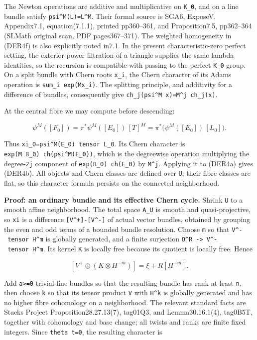 \documentclass[11pt,a4paper]{article}
\theoremstyle{definition}
\begin{document}
The Newton operations are additive and multiplicative on \texttt{K\_0},
and on a line bundle satisfy \texttt{psi\^{}M(L)=L\^{}M}. Their formal
source is SGA6, ExposeV, Appendix7.1, equation(7.1.1), printed
pp360--361, and Proposition7.5, pp362--364 (SLMath original scan, PDF
pages367--371). The weighted homogeneity in (DER4f) is also explicitly
noted in7.1. In the present characteristic-zero perfect setting, the
exterior-power filtration of a triangle supplies the same lambda
identities, so the recursion is compatible with passing to the perfect
\texttt{K\_0} group. On a split bundle with Chern roots \texttt{x\_i},
the Chern character of its Adams operation is
\texttt{sum\_i\ exp(Mx\_i)}. The splitting principle, and additivity for
a difference of bundles, consequently give
\texttt{ch\_j(psi\^{}M\ x)=M\^{}j\ ch\_j(x)}.

At the central fibre we may compute before descending:

\[
 \psi^M([F_0])
 =\pi^*\psi^M([E_0])\,[T]^M
 =\pi^*\bigl(\psi^M([E_0])\,[L_0]\bigr).
\]

Thus \texttt{xi\_0=psi\^{}M(E\_0)\ tensor\ L\_0}. Its Chern character is
\texttt{exp(M\ B\_0)\ ch(psi\^{}M(E\_0))}, which is the degreewise
operation multiplying the degree-\texttt{2j} component of
\texttt{exp(B\_0)\ ch(E\_0)} by \texttt{M\^{}j}. Applying it to (DER4a)
gives (DER4b). All objects and Chern classes are defined over
\texttt{U}; their fibre classes are flat, so this character formula
persists on the connected neighborhood.

\textbf{Proof: an ordinary bundle and its effective Chern cycle.} Shrink
\texttt{U} to a smooth affine neighborhood. The total space
\texttt{A\_U} is smooth and quasi-projective, so \texttt{xi} is a
difference \texttt{{[}V\^{}+{]}-{[}V\^{}-{]}} of actual vector bundles,
obtained by grouping the even and odd terms of a bounded bundle
resolution. Choose \texttt{m} so that \texttt{V\^{}-\ tensor\ H\^{}m} is
globally generated, and a finite surjection
\texttt{O\^{}R\ -\textgreater{}\ V\^{}-\ tensor\ H\^{}m}. Its kernel
\texttt{K} is locally free because its quotient is locally free. Hence

\[
 [V^+\oplus (K\otimes H^{-m})]
 =\xi+R[H^{-m}].
\]

Add \texttt{a\textgreater{}=0} trivial line bundles so that the
resulting bundle has rank at least \texttt{n}, then choose \texttt{k} so
that its tensor product \texttt{V} with \texttt{H\^{}k} is globally
generated and has no higher fibre cohomology on a neighborhood. The
relevant standard facts are Stacks Project Proposition28.27.13(7),
tag01Q3, and Lemma30.16.1(4), tag0B5T, together with cohomology and base
change; all twists and ranks are finite fixed integers. Since
\texttt{theta\ t=0}, the resulting character is
\end{document}
